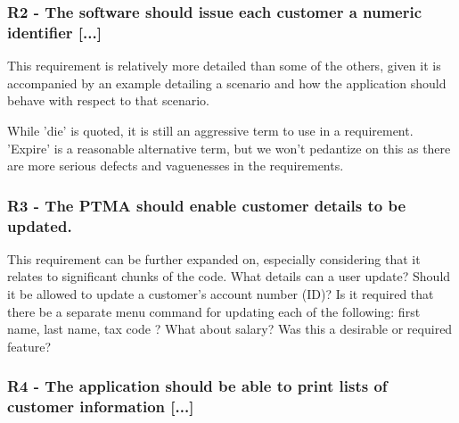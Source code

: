 \subsubsection{R2 - The software should issue each customer a numeric identifier [...]} %

This requirement is relatively more detailed than some of the others, given it is accompanied by an example detailing a scenario and how the application should behave with respect to that scenario. 

While 'die' is quoted, it is still an aggressive term to use in a requirement. 'Expire' is a reasonable alternative term, but we won't pedantize on this as there are more serious defects and vaguenesses in the requirements.

\subsubsection{R3 - The PTMA should enable customer details to be updated.}

This requirement can be further expanded on, especially considering that it relates to significant chunks of the code. 
What details can a user update? Should it be allowed to update a customer's account number (ID)?
Is it required that there be a separate menu command for updating each of the following: first name, last name, tax code ? What about salary? Was this a desirable or required feature?    


\subsubsection{R4 - The application should be able to print lists of customer information [...] } %

